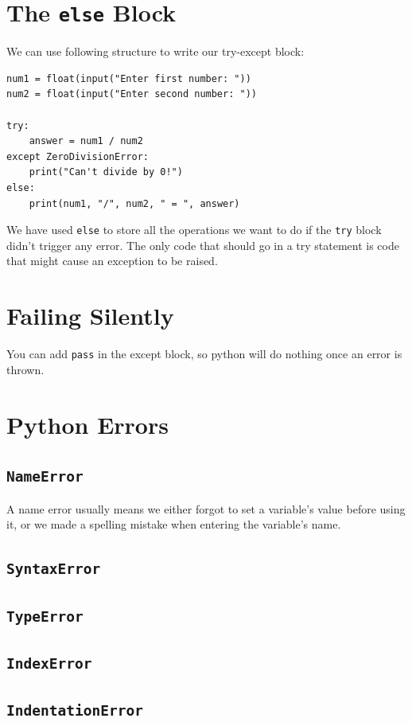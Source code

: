 \documentclass[12pt]{book}
\begin{document}
\section{The \texttt{else} Block}
\label{sec:org9343fdf}
We can use following structure to write our try-except block:
\begin{verbatim}
num1 = float(input("Enter first number: "))
num2 = float(input("Enter second number: "))

try:
    answer = num1 / num2
except ZeroDivisionError:
    print("Can't divide by 0!")
else:
    print(num1, "/", num2, " = ", answer)
\end{verbatim}
We have used \texttt{else} to store all the operations we want to do if the \texttt{try} block didn't trigger any error. The only code that should go in a try statement is code that might cause an exception to be raised.
\section{Failing Silently}
\label{sec:org23efbc3}
You can add \texttt{pass} in the except block, so python will do nothing once an error is thrown.
\section{Python Errors}
\label{sec:org7f6b2c8}
\subsection{\texttt{NameError}}
\label{sec:org33df308}
A name error usually means we either forgot to set a variable’s value before using it, or we made a spelling mistake when entering the variable’s name.
\subsection{\texttt{SyntaxError}}
\label{sec:orge939f62}
\subsection{\texttt{TypeError}}
\label{sec:org4fbaef7}
\subsection{\texttt{IndexError}}
\label{sec:orgfb274fb}
\subsection{\texttt{IndentationError}}
\label{sec:org72a3a88}
\end{document}
